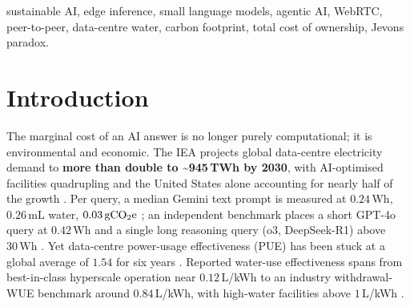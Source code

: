 \documentclass[conference]{IEEEtran}
\newcommand{\Wh}{\,\text{Wh}}
\newcommand{\mL}{\,\text{mL}}
\newcommand{\gco}{\,\text{gCO\textsubscript{2}e}}
\newcommand{\fs}{f_{s}}
\begin{document}
\begin{abstract}
Two further passes test this model where it is weakest. A companion study
\cite{autoyou2026adaptation} relaxes its central simplification, that per-class
capability is fixed by parameter count, and finds $\fs$ unchanged at an ordinary
acceptance threshold. A primary measurement campaign across two consumer hardware
platforms - an AMD Radeon 8060S APU (64\,GB unified memory) and an NVIDIA GeForce
RTX 5070 discrete GPU (12\,GB GDDR7) - grounds the edge decode, prefill, and
energy terms in direct observation. On the APU, single-stream generation reaches
78.4, 37.8, and 13.8\,tok/s for 3.8B, 8.9B, and 27.3B models, with prompt
regressions revealing prefill ratios of $0.050$--$0.078$. A nine-build bandwidth
ladder supports the memory-bound decode premise only in its ordering: builds that
stream every weight sit below builds that provably do not, by $30$ percentage
points, but the whole-weight class spans $77$--$106\%$ of the specified ceiling
rather than a tight band. One dense build exceeds a ceiling no whole-file reader
can exceed, which measures the error in the $\tau\!\cdot\!W$ proxy rather than
the hardware and bounds how tightly the statistic can be read. On the discrete
GPU, sampled board telemetry measures request-window energy at \RtxThreeEnergy{}\Wh\
(3B) and \RtxEightEnergy{}\Wh\ (8B) at 499 prompt and 300 output tokens, replicated
at \RepeatThreeEnergy{}\Wh\ and \RepeatEightEnergy{}\Wh; two significant figures
is all the instrument supports. Host-power sensitivities are evaluated up to
100\,W. The models, datasets, telemetry harnesses, and an empirical routing agent
are released openly, and every measured row is reported rather than
filtered.
\end{abstract}

\begin{IEEEkeywords}
sustainable AI, edge inference, small language models, agentic AI, WebRTC,
peer-to-peer, data-centre water, carbon footprint, total cost of ownership,
Jevons paradox.
\end{IEEEkeywords}

\section{Introduction}
The marginal cost of an AI answer is no longer purely computational; it is
environmental and economic. The IEA projects global data-centre electricity
demand to \textbf{more than double to \textasciitilde945\,TWh by 2030}, with
AI-optimised facilities quadrupling and the United States alone accounting for
nearly half of the growth \cite{iea2025}. Per query, a median Gemini text prompt
is measured at $0.24\Wh$, $0.26\mL$ water, $0.03\gco$ \cite{elsworth2025}; an
independent benchmark places a short GPT-4o query at $0.42\Wh$ and a single long
reasoning query (o3, DeepSeek-R1) above $30\Wh$ \cite{jegham2025}. Yet
data-centre power-usage effectiveness (PUE) has been stuck at a global average of
$1.54$ for six years \cite{uptime2025}. Reported water-use effectiveness spans
from best-in-class hyperscale operation near $0.12$\,L/kWh to an industry
withdrawal-WUE benchmark around $0.84$\,L/kWh, with high-water facilities above
$1$\,L/kWh \cite{aws_water2025,devriesgao2025}.
\end{document}

